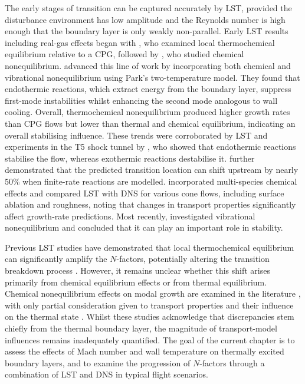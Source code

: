 The early stages of transition can be captured accurately by \gls{LST}, provided the disturbance environment has low amplitude and the Reynolds number is high enough that the boundary layer is only weakly non-parallel. Early \gls{LST} results including real-gas effects began with \cite{Malik1989, Malik1990a}, who examined local thermochemical equilibrium relative to a \gls{CPG}, followed by \cite{stuckertreed1994}, who studied chemical nonequilibrium. \cite{Hudson1997} advanced this line of work by incorporating both chemical and vibrational nonequilibrium using Park's two-temperature model. They found that endothermic reactions, which extract energy from the boundary layer, suppress first-mode instabilities whilst enhancing the second mode analogous to wall cooling. Overall, thermochemical nonequilibrium produced higher growth rates than \gls{CPG} flows but lower than thermal and chemical equilibrium, indicating an overall stabilising influence. These trends were corroborated by \gls{LST} and experiments in the T5 shock tunnel by \cite{JohnsonEtal1998}, who showed that endothermic reactions stabilise the flow, whereas exothermic reactions destabilise it. \cite{JohnsonCandler2005} further demonstrated that the predicted transition location can shift upstream by nearly 50\% when finite-rate reactions are modelled. \cite{MortensenZhong2013} incorporated multi-species chemical effects and compared \gls{LST} with \gls{DNS} for various cone flows, including surface ablation and roughness, noting that changes in transport properties significantly affect growth-rate predictions. Most recently, \cite{BitterShepherd2015} investigated vibrational nonequilibrium and concluded that it can play an important role in stability.

Previous \gls{LST} studies have demonstrated that local thermochemical equilibrium can significantly amplify the $N$-factors, potentially altering the transition breakdown process \citep{MiroMiro2019}. However, it remains unclear whether this shift arises primarily from chemical equilibrium effects or from thermal equilibrium. Chemical nonequilibrium effects on modal growth are examined in the literature \citep{FrankoMacCormackLele2010}, with only partial consideration given to transport properties and their influence on the thermal state \citep{LyttleReed2005}. Whilst these studies acknowledge that discrepancies stem chiefly from the thermal boundary layer, the magnitude of transport-model influences remains inadequately quantified. The goal of the current chapter is to assess the effects of Mach number and wall temperature on thermally excited boundary layers, and to examine the progression of $N$-factors through a combination of \gls{LST} and \gls{DNS} in typical flight scenarios.

